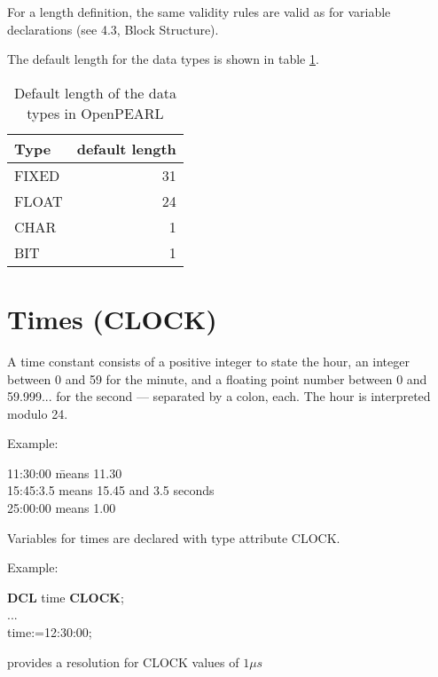 For a length definition, the same validity rules are valid as for
variable declarations (see 4.3, Block Structure).

The default length for the data types is shown in table \ref{tab_default_length}.

\begin{table}[bpht]
\begin{center}
\begin{tabular}{|l|r|}
\hline
Type & default length \\
\hline
FIXED & 31 \\
\hline
FLOAT & 24 \\
\hline
CHAR & 1 \\
\hline
BIT & 1 \\
\hline
\end{tabular}
\end{center}
\caption{Default length of the data types in OpenPEARL}
\label{tab_default_length}
\end{table}

\section{Times (CLOCK)}   %
\label{sec_type_clock}

A time constant consists of a positive integer to state the hour, an
integer between 0 and 59 for the minute, and a floating point number
between 0 and 59.999... for the second --- separated by a colon, each.
The hour is interpreted modulo 24.

Example:

\begin{tabbing}
11:30:00 \x \= means 11.30\\
15:45:3.5   \> means 15.45 and 3.5 seconds\\
25:00:00    \> means 1.00
\end{tabbing}

Variables for times are declared with type attribute CLOCK.



Example:

{\bf DCL} time {\bf CLOCK};\\
...\\
time:=12:30:00;

\OpenPEARL{} provides a resolution for CLOCK values of $1\mu s$

